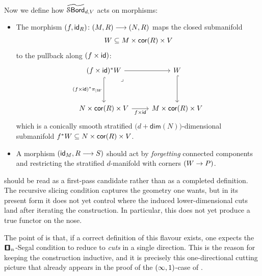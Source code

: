 \begin{construction}
    \noindent Now we define how $\operatorname{\widetilde{\mathcal S\mathsf{Bord}}}_{d,V}$ acts on morphisms:
    \begin{itemize}
    \item[$(\man)$] The morphism $(f,\mathsf{id}_{R})\colon (M,R) \longrightarrow (N,R)$ maps the closed submanifold 
    \begin{equation}
    W\subseteq M\times \operatorname{{\sf cor}}(R) \times V
    \end{equation}
    to the pullback along $(f\times \operatorname{\sf id})$:
    \begin{equation}
        \begin{tikzcd}[ampersand replacement=\&]
            {(f\times \id)^\ast W} \& {W} \\
            \\
            N\times \core(R) \times V \& M\times \core(R) \times V
            \arrow[from=1-1, to=1-2]
            \arrow[hook, "(f\times \id)^\ast \pi_{|W}"',from=1-1, to=3-1]
            \arrow["\lrcorner"{anchor=center, pos=0.125}, draw=none, from=1-1, to=3-2]
            \arrow[hook, from=1-2, to=3-2]
            \arrow["f\times \id"', from=3-1, to=3-2]
        \end{tikzcd}
    \end{equation}
    which is a conically smooth stratified $\big(d + \mathsf{dim}(N)\big)$-dimensional submanifold $f^\ast W \subseteq N \times \operatorname{{\sf cor}}(R) \times V$.
    \item[$(\cR\cube)$] A morphism $(\operatorname{\sf id}_M, R \longrightarrow S)$ should act by \emph{forgetting} connected components and restricting the stratified $d$-manifold with corners $(W\rightarrow P)$.
    \end{itemize} 
\end{construction}

\begin{warning}
 should be read as a first-pass candidate rather than as a completed definition. The recursive slicing condition captures the geometry one wants, but in its present form it does not yet control where the induced lower-dimensional cuts land after iterating the construction. In particular, this does not yet produce a true functor on the nose.
\end{warning}


The point of  is that, if a correct definition of this flavour exists, one expects the $\cube_n$-Segal condition to reduce to \emph{cuts} in a single direction. This is the reason for keeping the construction inductive, and it is precisely this one-directional cutting picture that already appears in the proof of the $(\operatorname{\infty},1)$-case of .

